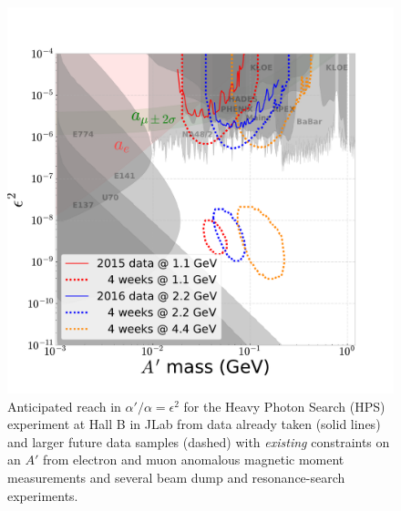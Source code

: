 \documentclass[b1]{sciposter}
\begin{document}
\begin{multicols}{3}
	\begin{figure}
		\begin{center}
			\includegraphics[width=1.0\textwidth]{reach/reach_new.pdf}
		\end{center}
		\caption{Anticipated reach in $\alpha'/\alpha=\epsilon^2$ for the Heavy Photon Search (HPS) experiment at Hall B in
		JLab from data already taken (solid lines) and larger future data samples (dashed) with \emph{existing} constraints on an $A'$ from electron and muon anomalous magnetic
		moment measurements and several beam dump and resonance-search experiments. %
		}
	\end{figure}

\end{multicols}
\end{document}
